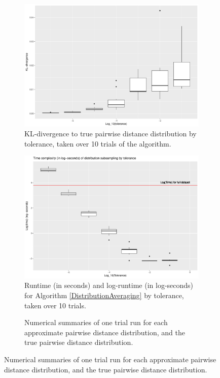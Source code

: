 \documentclass{article}
\begin{document}
\begin{figure}
\begin{subfigure}{.5\textwidth}
        \includegraphics[width=\linewidth]{Figures/PairwiseDistance/div_by_tol.pdf}
    	\caption{KL-divergence to true pairwise distance distribution by tolerance, taken over 10 trials of the algorithm.}
    	\label{fig:Divergences}
	\end{subfigure}
    \begin{subfigure}{.5\textwidth}
    	\includegraphics[width=0.9\linewidth]{Figures/PairwiseDistance/log_time_by_tol.pdf}
    	\caption{Runtime (in seconds) and log-runtime (in log-seconds) for Algorithm \ref{DistributionAveraging} by tolerance, taken over 10 trials.}
    	\label{fig:Times}
    \end{subfigure}
    \begin{subfigure}[H]{\textwidth}
    	\vspace{1em}
		
		\caption{Numerical summaries of one trial run for each approximate pairwise distance distribution, and the true pairwise distance distribution.}
		\label{tab:PDSummaryTable}
    \end{subfigure}
\end{figure}
\end{document}
